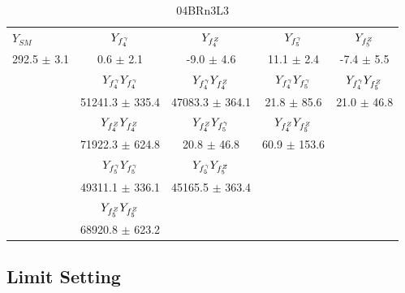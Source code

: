 \begin{table}[htbp]
\small
\centering
\begin{tabular}{lcccc}
\hline\hline
       $Y_{SM}$ &             $Y_{f_{4}^{\gamma}}$ &             $Y_{f_{4}^{Z}}$ &             $Y_{f_{5}^{\gamma}}$ &             $Y_{f_{5}^{Z}}$ \\
292.5 $\pm$ 3.1 &             0.6 $\pm$ 2.1 &            -9.0 $\pm$ 4.6 &            11.1 $\pm$ 2.4 &            -7.4 $\pm$ 5.5 \\
\hline
                &  $Y_{f_{4}^{\gamma}}Y_{f_{4}^{\gamma}}$ &  $Y_{f_{4}^{\gamma}}Y_{f_{4}^{Z}}$ &  $Y_{f_{4}^{\gamma}}Y_{f_{5}^{\gamma}}$ &  $Y_{f_{4}^{\gamma}}Y_{f_{5}^{Z}}$ \\
                &       51241.3 $\pm$ 335.4 &       47083.3 $\pm$ 364.1 &           21.8 $\pm$ 85.6 &           21.0 $\pm$ 46.8 \\
\hline
                &  $Y_{f_{4}^{Z}}Y_{f_{4}^{Z}}$ &  $Y_{f_{4}^{Z}}Y_{f_{5}^{\gamma}}$ &  $Y_{f_{4}^{Z}}Y_{f_{5}^{Z}}$ \\
                &       71922.3 $\pm$ 624.8 &           20.8 $\pm$ 46.8 &          60.9 $\pm$ 153.6 \\
\hline
                &  $Y_{f_{5}^{\gamma}}Y_{f_{5}^{\gamma}}$ &  $Y_{f_{5}^{\gamma}}Y_{f_{5}^{Z}}$ \\
                &       49311.1 $\pm$ 336.1 &       45165.5 $\pm$ 363.4 \\
\hline
                &  $Y_{f_{5}^{Z}}Y_{f_{5}^{Z}}$ \\
                &       68920.8 $\pm$ 623.2 \\
\hline\hline
\end{tabular}
\caption{04BRn3L3}
\end{table}

\subsection{Limit Setting}

